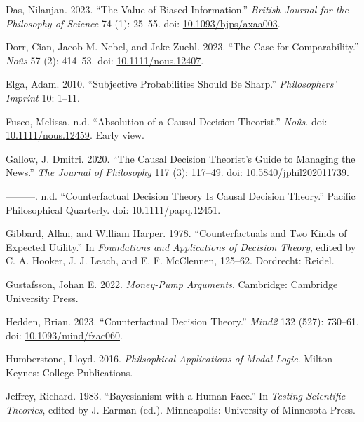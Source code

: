 \documentclass[
  10pt,
  letterpaper,
  DIV=11,
  numbers=noendperiod,
  twoside]{scrartcl}
\newlength{\cslhangindent}
\newenvironment{CSLReferences}[2] %
 {\begin{list}{}{%
  \setlength{\itemindent}{0pt}
  \setlength{\leftmargin}{0pt}
  \setlength{\parsep}{0pt}
  \ifodd #1
   \setlength{\leftmargin}{\cslhangindent}
   \setlength{\itemindent}{-1\cslhangindent}
  \fi
  \setlength{\itemsep}{#2\baselineskip}}}
 {\end{list}}
\begin{document}
\begin{CSLReferences}{1}{0}
Das, Nilanjan. 2023. {``The Value of Biased Information.''}
\emph{British Journal for the Philosophy of Science} 74 (1): 25--55.
doi: \href{https://doi.org/10.1093/bjps/axaa003}{10.1093/bjps/axaa003}.

Dorr, Cian, Jacob M. Nebel, and Jake Zuehl. 2023. {``The Case for
Comparability.''} \emph{Noûs} 57 (2): 414--53. doi:
\href{https://doi.org/10.1111/nous.12407}{10.1111/nous.12407}.

Elga, Adam. 2010. {``Subjective Probabilities Should Be Sharp.''}
\emph{Philosophers' Imprint} 10: 1--11.

Fusco, Melissa. n.d. {``Absolution of a Causal Decision Theorist.''}
\emph{No{û}s}. doi:
\href{https://doi.org/10.1111/nous.12459}{10.1111/nous.12459}. Early
view.

Gallow, J. Dmitri. 2020. {``The Causal Decision Theorist's Guide to
Managing the News.''} \emph{The Journal of Philosophy} 117 (3): 117--49.
doi:
\href{https://doi.org/10.5840/jphil202011739}{10.5840/jphil202011739}.

---------. n.d. {``Counterfactual Decision Theory Is Causal Decision
Theory.''} Pacific Philosophical Quarterly. doi:
\href{https://doi.org/10.1111/papq.12451}{10.1111/papq.12451}.

Gibbard, Allan, and William Harper. 1978. {``Counterfactuals and Two
Kinds of Expected Utility.''} In \emph{Foundations and Applications of
Decision Theory}, edited by C. A. Hooker, J. J. Leach, and E. F.
McClennen, 125--62. Dordrecht: Reidel.

Gustafsson, Johan E. 2022. \emph{Money-Pump Arguments}. Cambridge:
Cambridge University Press.

Hedden, Brian. 2023. {``Counterfactual Decision Theory.''} \emph{Mind2}
132 (527): 730--61. doi:
\href{https://doi.org/10.1093/mind/fzac060}{10.1093/mind/fzac060}.

Humberstone, Lloyd. 2016. \emph{Philsophical Applications of Modal
Logic}. Milton Keynes: College Publications.

Jeffrey, Richard. 1983. {``Bayesianism with a Human Face.''} In
\emph{Testing Scientific Theories}, edited by J. Earman (ed.).
Minneapolis: University of Minnesota Press.


\end{CSLReferences}
\end{document}
